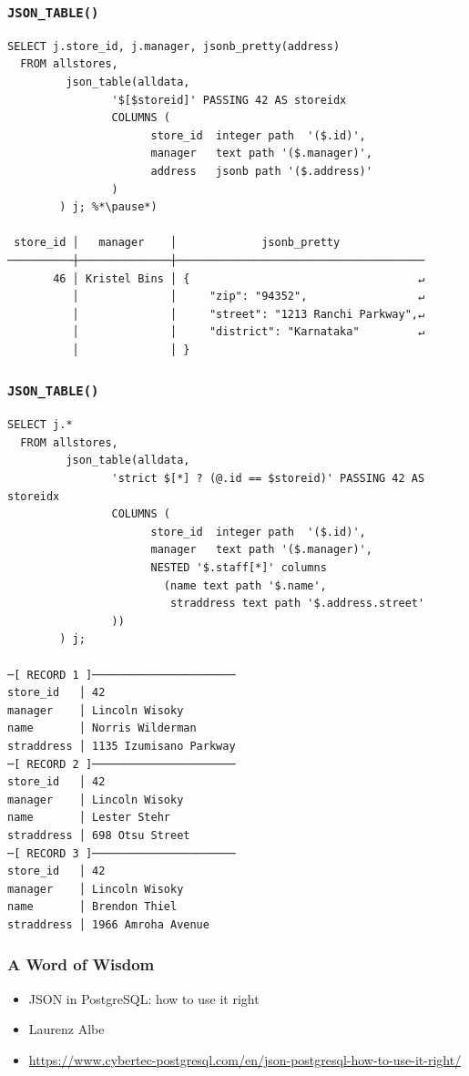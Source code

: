\begin{frame}[fragile]
  \frametitle{\texttt{JSON\_TABLE()}}
  \begin{lstlisting}
SELECT j.store_id, j.manager, jsonb_pretty(address)
  FROM allstores,
         json_table(alldata,
                '$[$storeid]' PASSING 42 AS storeidx
                COLUMNS (
                      store_id  integer path  '($.id)',
                      manager   text path '($.manager)',
                      address   jsonb path '($.address)'
                )
        ) j; %*\pause*)

 store_id │   manager    │             jsonb_pretty             
──────────┼──────────────┼──────────────────────────────────────
       46 │ Kristel Bins │ {                                   ↵
          │              │     "zip": "94352",                 ↵
          │              │     "street": "1213 Ranchi Parkway",↵
          │              │     "district": "Karnataka"         ↵
          │              │ }
  \end{lstlisting}
\end{frame}

\begin{frame}[fragile]
  \frametitle{\texttt{JSON\_TABLE()}}
  \begin{lstlisting}[basicstyle=\tiny\ttfamily]
SELECT j.* 
  FROM allstores,
         json_table(alldata,
                'strict $[*] ? (@.id == $storeid)' PASSING 42 AS storeidx
                COLUMNS (
                      store_id  integer path  '($.id)',
                      manager   text path '($.manager)', 
                      NESTED '$.staff[*]' columns
                        (name text path '$.name',
                         straddress text path '$.address.street'
                ))
        ) j;

─[ RECORD 1 ]──────────────────────
store_id   │ 42
manager    │ Lincoln Wisoky
name       │ Norris Wilderman
straddress │ 1135 Izumisano Parkway
─[ RECORD 2 ]──────────────────────
store_id   │ 42
manager    │ Lincoln Wisoky
name       │ Lester Stehr
straddress │ 698 Otsu Street
─[ RECORD 3 ]──────────────────────
store_id   │ 42
manager    │ Lincoln Wisoky
name       │ Brendon Thiel
straddress │ 1966 Amroha Avenue
  \end{lstlisting}
\end{frame}

\begin{frame}
\frametitle{A Word of Wisdom}

\begin{itemize}
  \item JSON in PostgreSQL: how to use it right
  \item Laurenz Albe
  \item \href{https://www.cybertec-postgresql.com/en/json-postgresql-how-to-use-it-right/}{https://www.cybertec-postgresql.com/en/json-postgresql-how-to-use-it-right/}
\end{itemize}

\end{frame}

